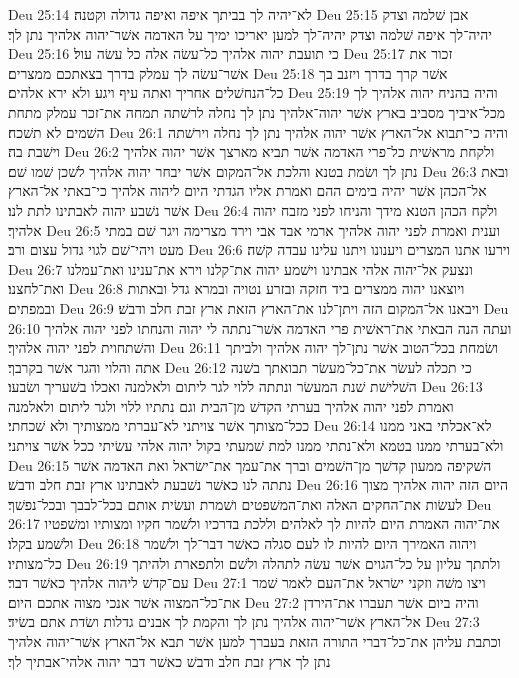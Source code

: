 Deu 25:14  לא־יהיה לך בביתך איפה ואיפה גדולה וקטנה׃
Deu 25:15  אבן שׁלמה וצדק יהיה־לך איפה שׁלמה וצדק יהיה־לך למען יאריכו ימיך על האדמה אשׁר־יהוה אלהיך נתן לך׃
Deu 25:16  כי תועבת יהוה אלהיך כל־עשׂה אלה כל עשׂה עול׃
Deu 25:17  זכור את אשׁר־עשׂה לך עמלק בדרך בצאתכם ממצרים׃
Deu 25:18  אשׁר קרך בדרך ויזנב בך כל־הנחשׁלים אחריך ואתה עיף ויגע ולא ירא אלהים׃
Deu 25:19  והיה בהניח יהוה אלהיך לך מכל־איביך מסביב בארץ אשׁר יהוה־אלהיך נתן לך נחלה לרשׁתה תמחה את־זכר עמלק מתחת השׁמים לא תשׁכח׃
Deu 26:1  והיה כי־תבוא אל־הארץ אשׁר יהוה אלהיך נתן לך נחלה וירשׁתה וישׁבת בה׃
Deu 26:2  ולקחת מראשׁית כל־פרי האדמה אשׁר תביא מארצך אשׁר יהוה אלהיך נתן לך ושׂמת בטנא והלכת אל־המקום אשׁר יבחר יהוה אלהיך לשׁכן שׁמו שׁם׃
Deu 26:3  ובאת אל־הכהן אשׁר יהיה בימים ההם ואמרת אליו הגדתי היום ליהוה אלהיך כי־באתי אל־הארץ אשׁר נשׁבע יהוה לאבתינו לתת לנו׃
Deu 26:4  ולקח הכהן הטנא מידך והניחו לפני מזבח יהוה אלהיך׃
Deu 26:5  וענית ואמרת לפני יהוה אלהיך ארמי אבד אבי וירד מצרימה ויגר שׁם במתי מעט ויהי־שׁם לגוי גדול עצום ורב׃
Deu 26:6  וירעו אתנו המצרים ויענונו ויתנו עלינו עבדה קשׁה׃
Deu 26:7  ונצעק אל־יהוה אלהי אבתינו וישׁמע יהוה את־קלנו וירא את־ענינו ואת־עמלנו ואת־לחצנו׃
Deu 26:8  ויוצאנו יהוה ממצרים ביד חזקה ובזרע נטויה ובמרא גדל ובאתות ובמפתים׃
Deu 26:9  ויבאנו אל־המקום הזה ויתן־לנו את־הארץ הזאת ארץ זבת חלב ודבשׁ׃
Deu 26:10  ועתה הנה הבאתי את־ראשׁית פרי האדמה אשׁר־נתתה לי יהוה והנחתו לפני יהוה אלהיך והשׁתחוית לפני יהוה אלהיך׃
Deu 26:11  ושׂמחת בכל־הטוב אשׁר נתן־לך יהוה אלהיך ולביתך אתה והלוי והגר אשׁר בקרבך׃
Deu 26:12  כי תכלה לעשׂר את־כל־מעשׂר תבואתך בשׁנה השׁלישׁת שׁנת המעשׂר ונתתה ללוי לגר ליתום ולאלמנה ואכלו בשׁעריך ושׂבעו׃
Deu 26:13  ואמרת לפני יהוה אלהיך בערתי הקדשׁ מן־הבית וגם נתתיו ללוי ולגר ליתום ולאלמנה ככל־מצותך אשׁר צויתני לא־עברתי ממצותיך ולא שׁכחתי׃
Deu 26:14  לא־אכלתי באני ממנו ולא־בערתי ממנו בטמא ולא־נתתי ממנו למת שׁמעתי בקול יהוה אלהי עשׂיתי ככל אשׁר צויתני׃
Deu 26:15  השׁקיפה ממעון קדשׁך מן־השׁמים וברך את־עמך את־ישׂראל ואת האדמה אשׁר נתתה לנו כאשׁר נשׁבעת לאבתינו ארץ זבת חלב ודבשׁ׃
Deu 26:16  היום הזה יהוה אלהיך מצוך לעשׂות את־החקים האלה ואת־המשׁפטים ושׁמרת ועשׂית אותם בכל־לבבך ובכל־נפשׁך׃
Deu 26:17  את־יהוה האמרת היום להיות לך לאלהים וללכת בדרכיו ולשׁמר חקיו ומצותיו ומשׁפטיו ולשׁמע בקלו׃
Deu 26:18  ויהוה האמירך היום להיות לו לעם סגלה כאשׁר דבר־לך ולשׁמר כל־מצותיו׃
Deu 26:19  ולתתך עליון על כל־הגוים אשׁר עשׂה לתהלה ולשׁם ולתפארת ולהיתך עם־קדשׁ ליהוה אלהיך כאשׁר דבר׃
Deu 27:1  ויצו משׁה וזקני ישׂראל את־העם לאמר שׁמר את־כל־המצוה אשׁר אנכי מצוה אתכם היום׃
Deu 27:2  והיה ביום אשׁר תעברו את־הירדן אל־הארץ אשׁר־יהוה אלהיך נתן לך והקמת לך אבנים גדלות ושׂדת אתם בשׂיד׃
Deu 27:3  וכתבת עליהן את־כל־דברי התורה הזאת בעברך למען אשׁר תבא אל־הארץ אשׁר־יהוה אלהיך נתן לך ארץ זבת חלב ודבשׁ כאשׁר דבר יהוה אלהי־אבתיך לך׃
